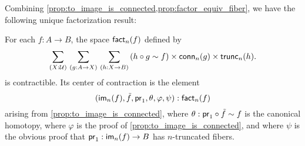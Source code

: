 
Combining \autoref{prop:to_image_is_connected,prop:factor_equiv_fiber}, we have the following unique factorization result:

\begin{thm}\label{thm:orth-fact}
For each $f:A\to B$, the space $\textsf{fact}_n(f)$ defined by
\begin{equation*}
\sm{X:\type}{g:A\to X}{h:X\to B} (h\circ g\htpy f)\times\mathsf{conn}_n(g)\times\mathsf{trunc}_n(h).
\end{equation*}
is contractible.
Its center of contraction is the element
\begin{equation*}
{\mathopen{}(\ensuremath{\mathsf{im}}_n(f),\tilde{f},\ensuremath{\mathsf{pr}_{1}},\theta,\varphi,\psi)\mathclose{}}:\textsf{fact}_n(f)
\end{equation*}
arising from \autoref{prop:to_image_is_connected},
where $\theta:\mathsf{pr}_{1}\circ\tilde{f}\sim f$ is the canonical homotopy, where $\varphi$ is the proof of
\autoref{prop:to_image_is_connected}, and where $\psi$ is the obvious proof that $\mathsf{pr}_{1}:\mathsf{im}_n(f)\to B$ has $n$-truncated fibers.
\end{thm}

